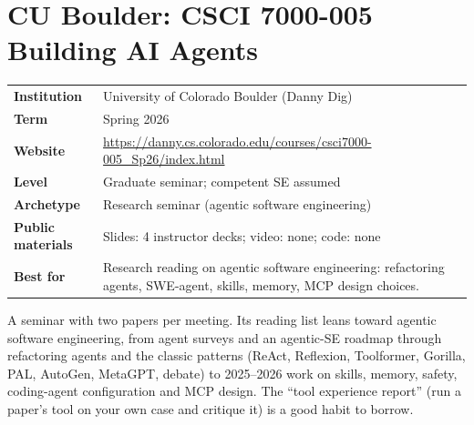 \documentclass[10pt,oneside]{report}
\begin{document}
\chapter{CU Boulder: CSCI 7000-005 Building AI Agents}\hypertarget{course-CU}{}
{\small\begin{tabularx}{\linewidth}{@{}>{\bfseries}l X@{}}\toprule
Institution & University of Colorado Boulder (Danny Dig)\\
Term & Spring 2026\\
Website & \href{https://danny.cs.colorado.edu/courses/csci7000-005_Sp26/index.html}{https://danny.cs.colorado.edu/courses/csci7000-005\_Sp26/index.html}\\
Level & Graduate seminar; competent SE assumed\\
Archetype & Research seminar (agentic software engineering)\\
Public materials & Slides: 4 instructor decks; video: none; code: none\\
Best for & Research reading on agentic software engineering: refactoring agents, SWE-agent, skills, memory, MCP design choices.\\
\bottomrule\end{tabularx}}

A seminar with two papers per meeting.
Its reading list leans toward agentic software engineering, from agent surveys and an agentic-SE roadmap through refactoring agents and the classic patterns (ReAct, Reflexion, Toolformer, Gorilla, PAL, AutoGen, MetaGPT, debate) to 2025--2026 work on skills, memory, safety, coding-agent configuration and MCP design.
The ``tool experience report'' (run a paper's tool on your own case and critique it) is a good habit to borrow.
\end{document}
